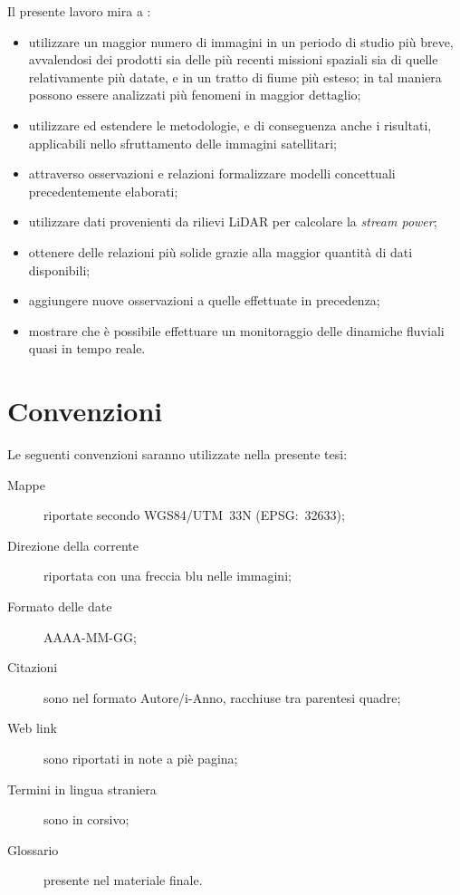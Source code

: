 Il presente lavoro mira a :
\begin{itemize}
	\item utilizzare un maggior numero di immagini in un periodo di studio più breve, avvalendosi dei prodotti sia delle più recenti missioni spaziali sia di quelle relativamente più datate, e in un tratto di fiume più esteso; in tal maniera possono essere analizzati più fenomeni in maggior dettaglio;
	\item utilizzare ed estendere le metodologie, e di conseguenza anche i risultati, applicabili nello sfruttamento delle immagini satellitari;
	\item attraverso osservazioni e relazioni formalizzare modelli concettuali precedentemente elaborati;
	\item utilizzare dati provenienti da rilievi LiDAR per calcolare la \emph{stream power};
	\item ottenere delle relazioni più solide grazie alla maggior quantità di dati disponibili;
	\item aggiungere nuove osservazioni a quelle effettuate in precedenza;
	\item mostrare che è possibile effettuare un monitoraggio delle dinamiche fluviali quasi in tempo reale. 
\end{itemize}



\section{Convenzioni}
Le seguenti convenzioni saranno utilizzate nella presente tesi:
\begin{description}
	\item[Mappe] riportate secondo WGS84/UTM~33N (EPSG:~32633);
	\item[Direzione della corrente] riportata con una freccia blu nelle immagini;
	\item[Formato delle date] AAAA-MM-GG;
	\item[Citazioni] sono nel formato Autore/i-Anno, racchiuse tra parentesi quadre;
	\item[Web link] sono riportati in note a piè pagina;
	\item[Termini in lingua straniera] sono in corsivo;
	\item[Glossario] presente nel materiale finale.
\end{description}

